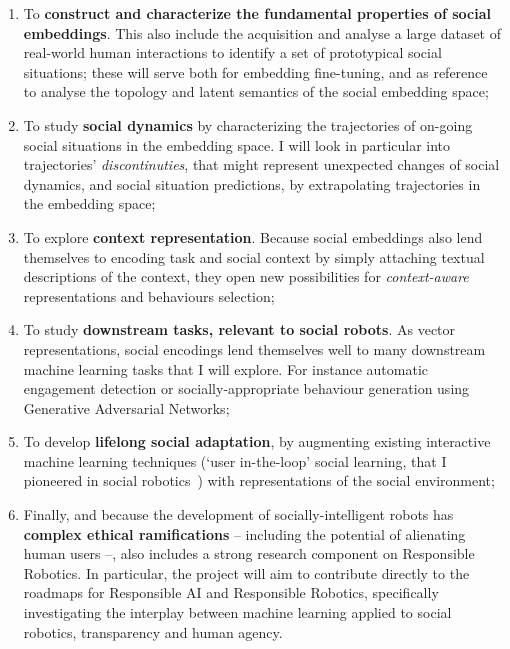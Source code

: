 \begin{enumerate}[label=\textbf{O\arabic*}]
    \item \label{T1} To \textbf{construct and characterize the fundamental
        properties of social embeddings}. This also include the acquisition and
        analyse a large dataset of real-world human interactions to identify a
        set of prototypical social situations; these will serve both for
        embedding fine-tuning, and as reference to analyse the topology and
        latent semantics of the social embedding space;

    \item \label{T2} To study \textbf{social dynamics} by characterizing the
        trajectories of on-going social situations in the embedding space. I
        will look in particular into trajectories' \emph{discontinuties}, that
        might represent unexpected changes of social dynamics, and social
        situation predictions, by extrapolating trajectories in the embedding
        space;

    \item \label{T5} To explore \textbf{context representation}. Because social
        embeddings also lend themselves to encoding task and social context by
        simply attaching textual descriptions of the context, they open new
        possibilities for \emph{context-aware} representations and behaviours
        selection;

    \item \label{T3} To study \textbf{downstream tasks, relevant to social
        robots}. As vector representations, social encodings lend themselves
        well to many downstream machine learning tasks that I will explore. For
        instance automatic engagement detection or socially-appropriate
        behaviour generation using Generative Adversarial Networks;

    \item \label{T4} To develop \textbf{lifelong social adaptation}, by
        augmenting existing interactive machine learning techniques (`user
        in-the-loop' social learning, that I pioneered in social
        robotics~\cite{senft2017supervised, winkle2020couch,winkle2021leador})
        with representations of the social environment;

    \item \label{T6} Finally, and because the development of
        socially-intelligent robots has \textbf{complex ethical ramifications}
        -- including the potential of alienating human users --, \project also
        includes a strong research component on Responsible Robotics. In
        particular, the project will aim to contribute directly to the roadmaps
        for Responsible AI and Responsible Robotics, specifically investigating
        the interplay between machine learning applied to social robotics,
        transparency and human agency.

\end{enumerate}

